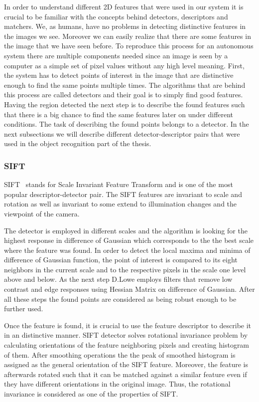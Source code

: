 In order to understand different 2D features that were used in our system it is crucial to be familiar with the concepts behind detectors, descriptors and matchers. We, as humans, have no problems in detecting distinctive features in the images we see. Moreover we can easily realize that there are some features in the image that we have seen before. To reproduce this process for an autonomous system there are multiple components needed since an image is seen by a computer as a simple set of pixel values without any high level meaning. First, the system has to detect points of interest in the image that are distinctive enough to find the same points multiple times. The algorithms that are behind this process are called detectors and their goal is to simply find good features. Having the region detected the next step is to describe the found features such that there is a big chance to find the same features later on under different conditions. The task of describing the found points belongs to a detector. In the next subsections we will describe different detector-descriptor pairs that were used in the object recognition part of the thesis.

\subsubsection{SIFT}
SIFT~\cite{lowe2004distinctive} stands for Scale Invariant Feature Transform and is one of the most popular descriptor-detector pair. The SIFT features are invariant to scale and rotation as well as invariant to some extend to illumination changes and the viewpoint of the camera.  

The detector is employed in different scales and the algorithm is looking for the highest response in difference of Gaussian which corresponds to the the best scale where the feature was found. In order to detect the local maxima and minima of difference of Gaussian function, the point of interest is compared to its eight neighbors in the current scale and to the respective pixels in the scale one level above and below. As the next step D.Lowe employs filters that remove low contrast and edge responses using Hessian Matrix on difference of Gaussian. After all these steps the found points are considered as being robust enough to be further used.

Once the feature is found, it is crucial to use the feature descriptor to describe it in an distinctive manner.  SIFT detector solves rotational invariance problem by calculating orientations of the feature neighboring pixels and creating histogram of them. After smoothing operations the the peak of smoothed histogram is assigned as the general orientation of the SIFT feature. Moreover, the feature is afterwards rotated such that it can be matched against a similar feature even if they have different orientations in the original image. Thus, the rotational invariance is considered as one of the properties of SIFT.

